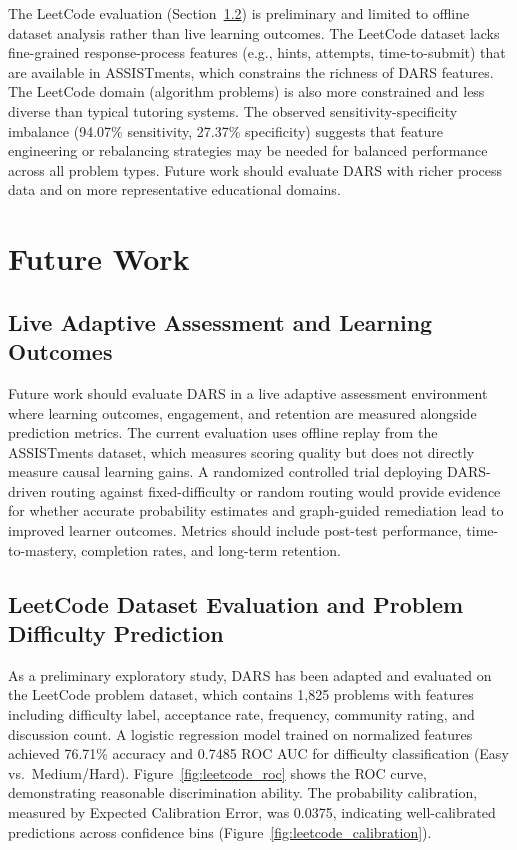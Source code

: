 \documentclass[conference]{IEEEtran}
\begin{document}
The LeetCode evaluation (Section~\ref{sec:leetcode}) is preliminary and limited to offline dataset analysis rather than live learning outcomes. The LeetCode dataset lacks fine-grained response-process features (e.g., hints, attempts, time-to-submit) that are available in ASSISTments, which constrains the richness of DARS features. The LeetCode domain (algorithm problems) is also more constrained and less diverse than typical tutoring systems. The observed sensitivity-specificity imbalance (94.07\% sensitivity, 27.37\% specificity) suggests that feature engineering or rebalancing strategies may be needed for balanced performance across all problem types. Future work should evaluate DARS with richer process data and on more representative educational domains.

\section{Future Work}

\subsection{Live Adaptive Assessment and Learning Outcomes}
Future work should evaluate DARS in a live adaptive assessment environment where learning outcomes, engagement, and retention are measured alongside prediction metrics. The current evaluation uses offline replay from the ASSISTments dataset, which measures scoring quality but does not directly measure causal learning gains. A randomized controlled trial deploying DARS-driven routing against fixed-difficulty or random routing would provide evidence for whether accurate probability estimates and graph-guided remediation lead to improved learner outcomes. Metrics should include post-test performance, time-to-mastery, completion rates, and long-term retention.

\subsection{LeetCode Dataset Evaluation and Problem Difficulty Prediction}
\label{sec:leetcode}
As a preliminary exploratory study, DARS has been adapted and evaluated on the LeetCode problem dataset, which contains 1,825 problems with features including difficulty label, acceptance rate, frequency, community rating, and discussion count. A logistic regression model trained on normalized features achieved 76.71\% accuracy and 0.7485 ROC AUC for difficulty classification (Easy vs.\ Medium/Hard). Figure~\ref{fig:leetcode_roc} shows the ROC curve, demonstrating reasonable discrimination ability. The probability calibration, measured by Expected Calibration Error, was 0.0375, indicating well-calibrated predictions across confidence bins (Figure~\ref{fig:leetcode_calibration}).
\end{document}
